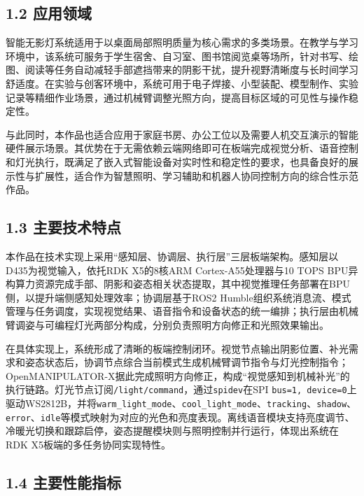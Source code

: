 \documentclass[UTF8,a4paper,zihao=-4]{ctexart}
\begin{document}
\subsection*{1.2 应用领域}

智能无影灯系统适用于以桌面局部照明质量为核心需求的多类场景。在教学与学习环境中，该系统可服务于学生宿舍、自习室、图书馆阅览桌等场所，针对书写、绘图、阅读等任务自动减轻手部遮挡带来的阴影干扰，提升视野清晰度与长时间学习舒适度。在实验与创客环境中，系统可用于电子焊接、小型装配、模型制作、实验记录等精细作业场景，通过机械臂调整光照方向，提高目标区域的可见性与操作稳定性。

与此同时，本作品也适合应用于家庭书房、办公工位以及需要人机交互演示的智能硬件展示场景。其优势在于无需依赖云端网络即可在板端完成视觉分析、语音控制和灯光执行，既满足了嵌入式智能设备对实时性和稳定性的要求，也具备良好的展示性与扩展性，适合作为智慧照明、学习辅助和机器人协同控制方向的综合性示范作品。

\subsection*{1.3 主要技术特点}

本作品在技术实现上采用“感知层、协调层、执行层”三层板端架构。感知层以D435为视觉输入，依托RDK X5的8核ARM Cortex-A55处理器与10 TOPS BPU异构算力资源完成手部、阴影和姿态相关状态提取，其中视觉推理任务部署在BPU侧，以提升端侧感知处理效率；协调层基于ROS2 Humble组织系统消息流、模式管理与任务调度，实现视觉结果、语音指令和设备状态的统一编排；执行层由机械臂调姿与可编程灯光两部分构成，分别负责照明方向修正和光照效果输出。

在具体实现上，系统形成了清晰的板端控制闭环。视觉节点输出阴影位置、补光需求和姿态状态后，协调节点综合当前模式生成机械臂调节指令与灯光控制指令；OpenMANIPULATOR-X据此完成照明方向修正，构成“视觉感知到机械补光”的执行链路。灯光节点订阅\texttt{/light/command}，通过\texttt{spidev}在SPI \texttt{bus=1, device=0}上驱动WS2812B，并将\texttt{warm\_light\_mode}、\texttt{cool\_light\_mode}、\texttt{tracking}、\texttt{shadow}、\texttt{error}、\texttt{idle}等模式映射为对应的光色和亮度表现。离线语音模块支持亮度调节、冷暖光切换和跟踪启停，姿态提醒模块则与照明控制并行运行，体现出系统在RDK X5板端的多任务协同实现特性。

\subsection*{1.4 主要性能指标}
\end{document}
